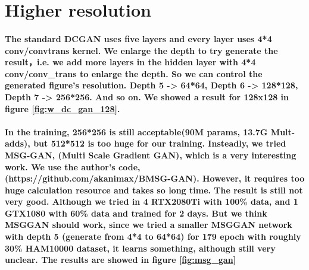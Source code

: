            
\section{Higher resolution}
\paragraph{
The standard DCGAN uses five layers and every layer uses 4*4 conv/convtrans kernel. We enlarge the depth to try generate the result，i.e. we add more layers in the hidden layer with 4*4 conv/conv\_trans to enlarge the depth. So we can control the generated figure's resolution. Depth 5 -> 64*64, Depth 6 -> 128*128, Depth 7 -> 256*256. And so on. We showed a result for 128x128 in figure \ref{fig:w_dc_gan_128}.
}

\paragraph{
In the training, 256*256 is still acceptable(90M params, 13.7G Mult-adds), but 512*512 is too huge for our training. Insteadly, we tried MSG-GAN, (Multi Scale Gradient GAN), which is a very interesting work. We use the author's code, (https://github.com/akanimax/BMSG-GAN). However, it requires too huge calculation resource and takes so long time. The result is still not very good. Although we tried in 4 RTX2080Ti with 100\% data, and 1 GTX1080 with 60\% data and trained for 2 days. But we think MSGGAN should work, since we tried a smaller MSGGAN network with depth 5 (generate from 4*4 to 64*64) for 179 epoch with roughly 30\% HAM10000 dataset, it learns something, although still very unclear. The results are showed in figure \ref{fig:msg_gan}
}
